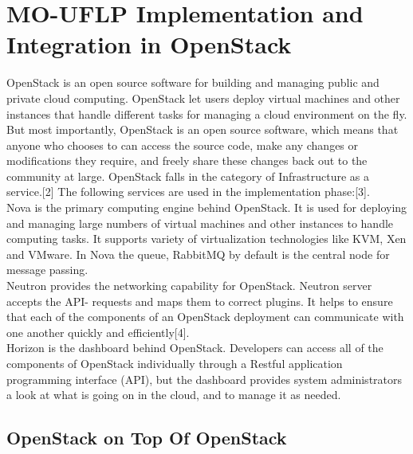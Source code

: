 \documentclass{article}
\begin{document}
\section{MO-UFLP Implementation and Integration in OpenStack}

OpenStack is an open source software for building and managing public and private cloud computing. OpenStack let users deploy virtual machines and other instances that handle different tasks for managing a cloud environment on the fly. But most importantly, OpenStack is an open source software, which means that anyone who chooses to can access the source code, make any changes or modifications they require, and freely share these changes back out to the community at large. OpenStack falls in the category of Infrastructure as a service.[2]
The following services are used in the implementation phase:[3].\\
Nova is the primary computing engine behind OpenStack. It is used for deploying and managing large numbers of virtual machines and other instances to handle computing tasks. It supports variety of virtualization technologies like KVM, Xen and VMware. In Nova the queue, RabbitMQ by default is the central node for message passing.\\
Neutron provides the networking capability for OpenStack. Neutron server accepts the API- requests and maps them to correct plugins. It helps to ensure that each of the components of an OpenStack deployment can communicate with one another quickly and efficiently[4].\\
Horizon is the dashboard behind OpenStack.  Developers can access all of the components of OpenStack individually through a Restful application programming interface (API), but the dashboard provides system administrators a look at what is going on in the cloud, and to manage it as needed.


\subsection{OpenStack on Top Of OpenStack}
\end{document}
